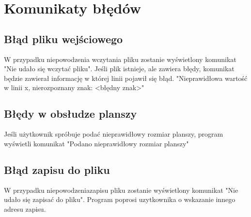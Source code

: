 \documentclass[10pt, oneside]{article}
\begin{document}
\section{Komunikaty błędów}
\subsection{Błąd pliku wejściowego}
W przypadku niepowodzenia wczytania pliku zostanie wyświetlony komunikat "Nie udało się wczytać pliku".
Jeśli plik istnieje, ale zawiera błędy, komunikat będzie zawierał informację w której linii pojawił się błąd. 
"Nieprawidłowa wartość w linii x, nierozpoznany znak: <błędny znak>"
\subsection{Błędy w obsłudze planszy}
 Jeśli użytkownik spróbuje podać nieprawidłowy rozmiar planszy, program wyświetli komunikat "Podano nieprawidłowy rozmiar planszy"
\subsection{Błąd zapisu do pliku}
W przypadku niepowodzeniazapisu pliku zostanie wyświetlony komunikat "Nie udało się zapisać do pliku". Program poprosi uzytkownika o wskazanie innego adresu zapisu.
\end{document}
